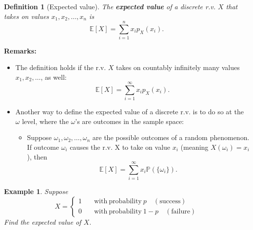 \documentclass[12pt]{amsart}
\newtheorem{definition}[theorem]{Definition}
\newtheorem{example}[theorem]{Example}
\begin{document}
{%


\begin{definition}[Expected value]
The \textbf{expected value} of a discrete r.v. $X$ that takes on values $x_1,  x_2, \ldots, x_n$ is
$$
\mathbb{E}[X] = \sum_{i=1}^n x_ip_X(x_i).
$$ 
\end{definition}

\vspace{.5cm}


\textbf{Remarks:} %
\begin{itemize}
\item 
The definition holds if the r.v. $X$ takes on countably infinitely many values $x_1,  x_2, \ldots$, as well:
$$
\mathbb{E}[X] = \sum_{i=1}^{\infty} x_ip_X(x_i).
$$
\item Another way to define the expected value of a discrete r.v. is to do so at the $\omega$ level, where the $\omega$'s are outcomes in the sample space:
	\begin{itemize}
	\item Suppose $\omega_1, \omega_2, \ldots, \omega_n$ are the possible outcomes of a random phenomenon. If outcome $\omega_i$ causes the r.v. X to take on value $x_i$ (meaning $X(\omega_i)=x_i$), then  
	$$
		\mathbb{E}[X] = \sum_{i=1}^{\infty} x_i\mathbb{P}(\{\omega_i\}).
	$$
	\end{itemize}
\end{itemize}

 



\newpage

\begin{example}\label{Bernoulli_E}
Suppose
$$
X = \left\{
        \begin{array}{ll}
            1 & \quad \mathrm{with\ probability}\ p \quad\mathrm{(success)}\\
            0 & \quad \mathrm{with\ probability}\ 1-p \quad\mathrm{(failure)}
        \end{array}
    \right.
$$
Find the expected value of $X$.
\end{example}

}
\end{document}
